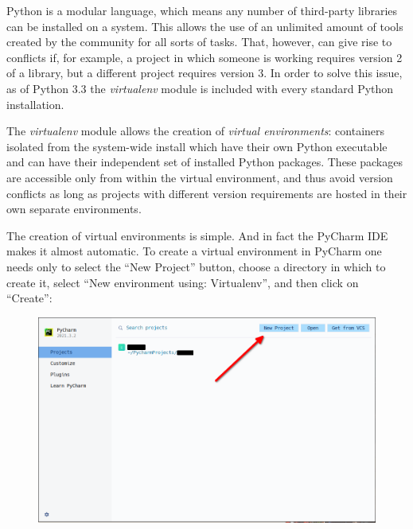 \documentclass[a4paper,12pt]{article}
\begin{document}
Python is a modular language, which means any number of third-party libraries can be installed on a system. This allows the use of an unlimited amount of tools created by the community for all sorts of tasks. That, however, can give rise to conflicts if, for example, a project in which someone is working requires version 2 of a library, but a different project requires version 3. In order to solve this issue, as of Python 3.3 the {\slshape virtualenv} module is included with every standard Python installation.

The {\slshape virtualenv} module allows the creation of {\itshape virtual environments}: containers isolated from the system-wide install which have their own Python executable and can have their independent set of installed Python packages. These packages are accessible only from within the virtual environment, and thus avoid version conflicts as long as projects with different version requirements are hosted in their own separate environments.

The creation of virtual environments is simple. And in fact the PyCharm IDE makes it almost automatic. To create a virtual environment in PyCharm one needs only to select the ``New Project'' button, choose a directory in which to create it, select ``New environment using: Virtualenv'', and then click on ``Create'':

\begin{figure}[!ht]
    \begin{center}
        \includegraphics[scale=0.5]{pycharm-new-project.png}
    \end{center}
\end{figure}
\end{document}
